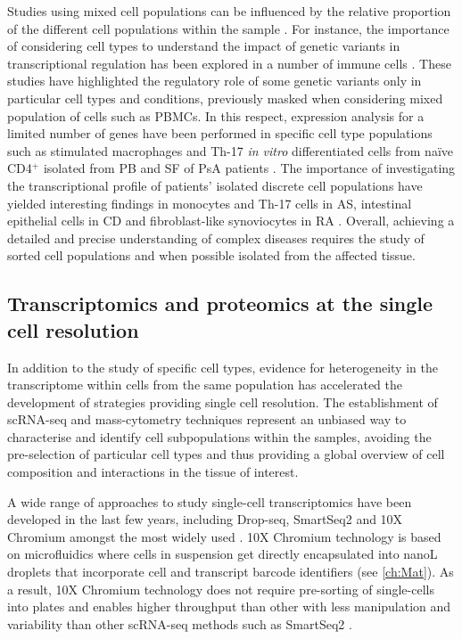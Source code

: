 Studies using mixed cell populations can be influenced by the relative proportion of the different cell populations within the sample \parencite{Whitney2003}. For instance, the importance of considering cell types to understand the impact of genetic variants in transcriptional regulation has been explored in a number of immune cells \parencite{Fairfax2012, Fairfax2014, Raj2014, Peters2016, Kasela2017}. These studies have highlighted the regulatory role of some genetic variants only in particular cell types and conditions, previously masked when considering mixed population of cells such as PBMCs. In this respect, expression analysis for a limited number of genes have been performed in specific cell type populations such as stimulated macrophages and Th-17 \textit{in vitro} differentiated cells from na\"{i}ve CD4$^+$ isolated from PB and SF of PsA patients \parencite{Antoniv2006, Leipe2010}. The importance of investigating the transcriptional profile of patients' isolated discrete cell populations have yielded interesting findings in monocytes and Th-17 cells in AS, intestinal epithelial cells in CD and fibroblast-like synoviocytes in RA \parencite{Al-Mossawi2017,Smith2008, Howell2018, Ai2016}. Overall, achieving a detailed and precise understanding of complex diseases requires the study of sorted cell populations and when possible isolated from the affected tissue.  


\subsection{Transcriptomics and proteomics at the single cell resolution}

In addition to the study of specific cell types, evidence for heterogeneity in the transcriptome within cells from the same population has accelerated the development of strategies providing single cell resolution. The establishment of scRNA-seq and mass-cytometry techniques represent an unbiased way to characterise and identify cell subpopulations within the samples, avoiding the pre-selection of particular cell types and thus providing a global overview of cell composition and interactions in the tissue of interest. 

A wide range of approaches to study single-cell transcriptomics have been developed in the last few years, including Drop-seq, SmartSeq2 and 10X Chromium amongst the most widely used \parencite{Picelli2014,Ziegenhain2017}. 10X Chromium technology is based on microfluidics where cells in suspension get directly encapsulated into nanoL droplets that incorporate cell and transcript barcode identifiers (see \ref{ch:Mat}). As a result, 10X Chromium technology does not require pre-sorting of single-cells into plates and enables higher throughput than other with less manipulation and variability than other scRNA-seq methods such as SmartSeq2 \parencite{Baran-Gale2017}.
 
